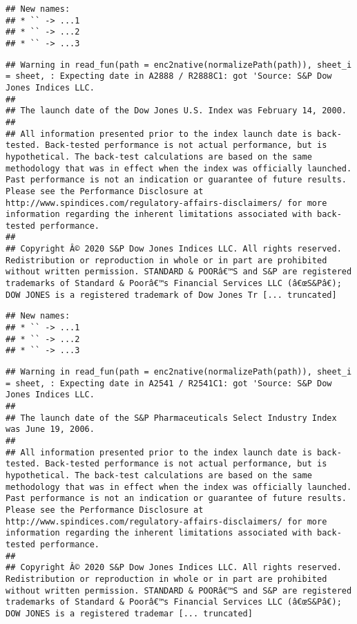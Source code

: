 \documentclass[
]{article}
\begin{document}
\begin{verbatim}
## New names:
## * `` -> ...1
## * `` -> ...2
## * `` -> ...3
\end{verbatim}

\begin{verbatim}
## Warning in read_fun(path = enc2native(normalizePath(path)), sheet_i = sheet, : Expecting date in A2888 / R2888C1: got 'Source: S&P Dow Jones Indices LLC.
## 
## The launch date of the Dow Jones U.S. Index was February 14, 2000.
## 
## All information presented prior to the index launch date is back-tested. Back-tested performance is not actual performance, but is hypothetical. The back-test calculations are based on the same methodology that was in effect when the index was officially launched. Past performance is not an indication or guarantee of future results.  Please see the Performance Disclosure at http://www.spindices.com/regulatory-affairs-disclaimers/ for more information regarding the inherent limitations associated with back-tested performance.
## 
## Copyright Â© 2020 S&P Dow Jones Indices LLC. All rights reserved. Redistribution or reproduction in whole or in part are prohibited without written permission. STANDARD & POORâ€™S and S&P are registered trademarks of Standard & Poorâ€™s Financial Services LLC (â€œS&Pâ€); DOW JONES is a registered trademark of Dow Jones Tr [... truncated]
\end{verbatim}

\begin{verbatim}
## New names:
## * `` -> ...1
## * `` -> ...2
## * `` -> ...3
\end{verbatim}

\begin{verbatim}
## Warning in read_fun(path = enc2native(normalizePath(path)), sheet_i = sheet, : Expecting date in A2541 / R2541C1: got 'Source: S&P Dow Jones Indices LLC.
## 
## The launch date of the S&P Pharmaceuticals Select Industry Index was June 19, 2006.
## 
## All information presented prior to the index launch date is back-tested. Back-tested performance is not actual performance, but is hypothetical. The back-test calculations are based on the same methodology that was in effect when the index was officially launched. Past performance is not an indication or guarantee of future results.  Please see the Performance Disclosure at http://www.spindices.com/regulatory-affairs-disclaimers/ for more information regarding the inherent limitations associated with back-tested performance.
## 
## Copyright Â© 2020 S&P Dow Jones Indices LLC. All rights reserved. Redistribution or reproduction in whole or in part are prohibited without written permission. STANDARD & POORâ€™S and S&P are registered trademarks of Standard & Poorâ€™s Financial Services LLC (â€œS&Pâ€); DOW JONES is a registered trademar [... truncated]
\end{verbatim}
\end{document}

